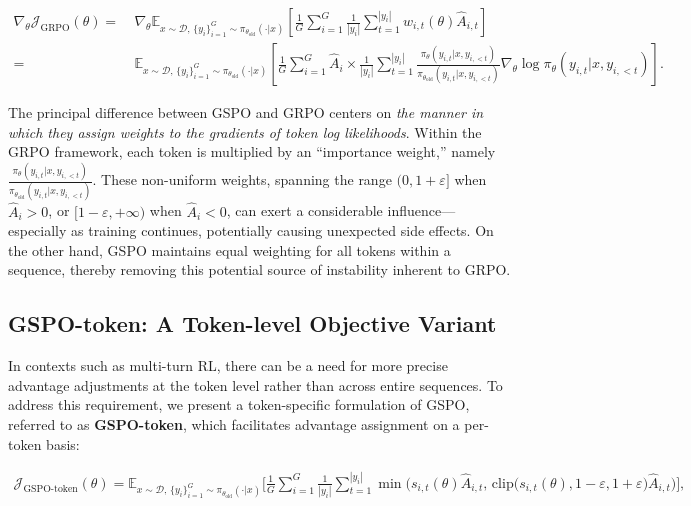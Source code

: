 \begin{align}
\nabla_{\theta} \mathcal{J}_\text{GRPO} (\theta) 
=&\
\nabla_{\theta} \mathbb{E}_{ x \sim \mathcal{D},\, \{y_i\}_{i=1}^G \sim \pi_{\theta_\text{old}}( \cdot | x) }
\left[ \frac{1}{G} \sum_{i=1}^{G} \frac{1}{|y_i|} \sum_{t=1}^{|y_i|} 
w_{i,t}(\theta) \widehat{A}_{i,t}
\right] \\
=&\
\mathbb{E}_{ x \sim \mathcal{D},\, \{y_i\}_{i=1}^G \sim \pi_{\theta_\text{old}}( \cdot | x) }
\left[ \frac{1}{G} \sum_{i=1}^{G} \widehat{A}_{i} 
\times \frac{1}{|y_i|} \sum_{t=1}^{|y_i|} 
\frac{ \pi_{\theta} (y_{i,t} | x, y_{i,<t}) }{ \pi_{\theta_\text{old}} (y_{i,t} | x,y_{i,<t})} 
\nabla_{\theta} \log \pi_{\theta} (y_{i,t} | x, y_{i,<t})  
\right].
\end{align}

The principal difference between GSPO and GRPO centers on \textit{the manner in which they assign weights to the gradients of token log likelihoods}. Within the GRPO framework, each token is multiplied by an ``importance weight,'' namely $\frac{ \pi_{\theta} (y_{i,t} | x, y_{i,<t}) }{ \pi_{\theta_\text{old}} (y_{i,t} | x,y_{i,<t})}$. These non-uniform weights, spanning the range $(0, 1+\varepsilon]$ when $\widehat{A}_{i} > 0$, or $[1-\varepsilon, +\infty)$ when $\widehat{A}_{i} < 0$, can exert a considerable influence—especially as training continues, potentially causing unexpected side effects. On the other hand, GSPO maintains equal weighting for all tokens within a sequence, thereby removing this potential source of instability inherent to GRPO.

\subsection{GSPO-token: A Token-level Objective Variant}

In contexts such as multi-turn RL, there can be a need for more precise advantage adjustments at the token level rather than across entire sequences. To address this requirement, we present a token-specific formulation of GSPO, referred to as \textbf{GSPO-token}, which facilitates advantage assignment on a per-token basis:

\begin{align}
\mathcal{J}_\text{GSPO-token}(\theta)
=
\mathbb{E}_{ x \sim \mathcal{D},\, \{y_i\}_{i=1}^G \sim \pi_{\theta_\text{old}}( \cdot | x) }
\Bigg[ 
\frac{1}{G} \sum_{i=1}^{G} \frac{1}{|y_i|} \sum_{t=1}^{|y_i|} 
\min \bigg( s_{i,t}(\theta) \widehat{A}_{i,t},\,
\mathrm{clip} \Big( s_{i,t}(\theta), 1-{\varepsilon}, 1+{\varepsilon} \Big) \widehat{A}_{i,t} \bigg)
\Bigg],
\label{equ:gspo-token}
\end{align}

